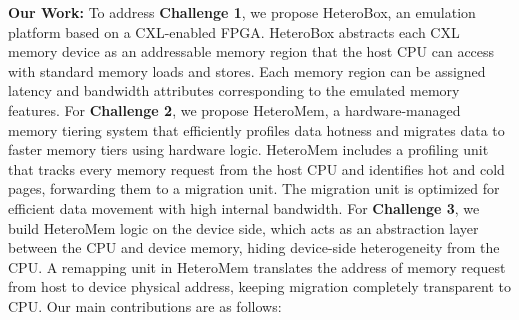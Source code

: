 \noindent\textbf{Our Work:}
To address \textbf{Challenge 1}, we propose HeteroBox, an emulation platform based on a CXL-enabled FPGA. 
HeteroBox abstracts each CXL memory device as an addressable memory region that the host CPU can access with standard memory loads and stores. 
Each memory region can be assigned latency and bandwidth attributes corresponding to the emulated memory features.
For \textbf{Challenge 2}, we propose HeteroMem, a hardware-managed memory tiering system that efficiently profiles data hotness and migrates data to faster memory tiers using hardware logic. HeteroMem includes a profiling unit that tracks every memory request from the host CPU and identifies hot and cold pages, forwarding them to a migration unit. The migration unit is optimized for efficient data movement with high internal bandwidth.
For \textbf{Challenge 3}, we build HeteroMem logic on the device side, which acts as an abstraction layer between the CPU and device memory, hiding device-side heterogeneity from the CPU. 
A remapping unit in HeteroMem translates the address of memory request from host to device physical address, keeping migration completely transparent to CPU.
Our main contributions are as follows: 



